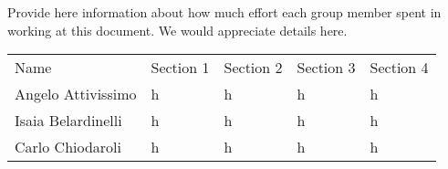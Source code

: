 Provide here information about how much effort each group member spent in working at this document. We would appreciate details here.


\begin{center}
    \begin{tabu}{|X[1.5]|X|X|X|X|} \hline \everyrow{\hline}
        Name & Section 1 & Section 2 & Section 3 & Section 4 \\ 
        Angelo Attivissimo & h & h & h & h \\
        Isaia Belardinelli & h & h & h & h \\
        Carlo Chiodaroli & h & h & h & h \\ 
    \end{tabu}
\end{center}